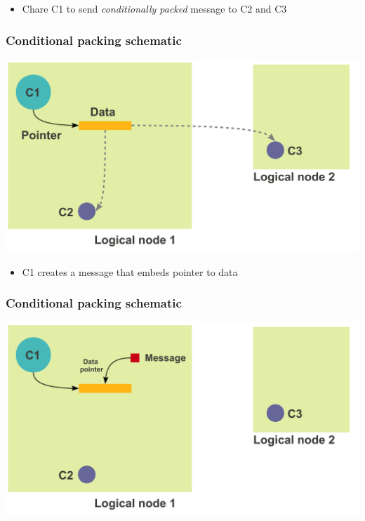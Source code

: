 \begin{frame}[fragile]
  \begin{itemize}
    \item Chare C1 to send {\em conditionally packed} message to C2 and C3
  \end{itemize}
  \frametitle{Conditional packing schematic}
  \includegraphics[width=\textwidth]{figures/advancedOpts/fig1}
\end{frame}

\begin{frame}[fragile]
  \begin{itemize}
    \item C1 creates a message that embeds pointer to data
  \end{itemize}
  \frametitle{Conditional packing schematic}
  \includegraphics[width=\textwidth]{figures/advancedOpts/fig2}
\end{frame}

